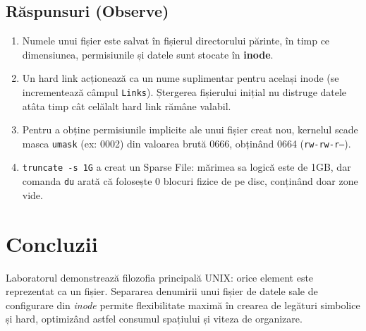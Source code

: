 \documentclass[12pt,a4paper]{article}
\begin{document}
\subsection{Răspunsuri (Observe)}
\begin{enumerate}
    \item Numele unui fișier este salvat în fișierul directorului părinte, în timp ce dimensiunea, permisiunile și datele sunt stocate în \textbf{inode}.
    \item Un hard link acționează ca un nume suplimentar pentru același inode (se incrementează câmpul \texttt{Links}). Ștergerea fișierului inițial nu distruge datele atâta timp cât celălalt hard link rămâne valabil.
    \item Pentru a obține permisiunile implicite ale unui fișier creat nou, kernelul scade masca \texttt{umask} (ex: 0002) din valoarea brută 0666, obținând 0664 (\texttt{rw-rw-r--}).
    \item \texttt{truncate -s 1G} a creat un Sparse File: mărimea sa logică este de 1GB, dar comanda \texttt{du} arată că folosește 0 blocuri fizice de pe disc, conținând doar zone vide.
\end{enumerate}

\section{Concluzii}
Laboratorul demonstrează filozofia principală UNIX: orice element este reprezentat ca un fișier. Separarea denumirii unui fișier de datele sale de configurare din \textit{inode} permite flexibilitate maximă în crearea de legături simbolice și hard, optimizând astfel consumul spațiului și viteza de organizare.
\end{document}
